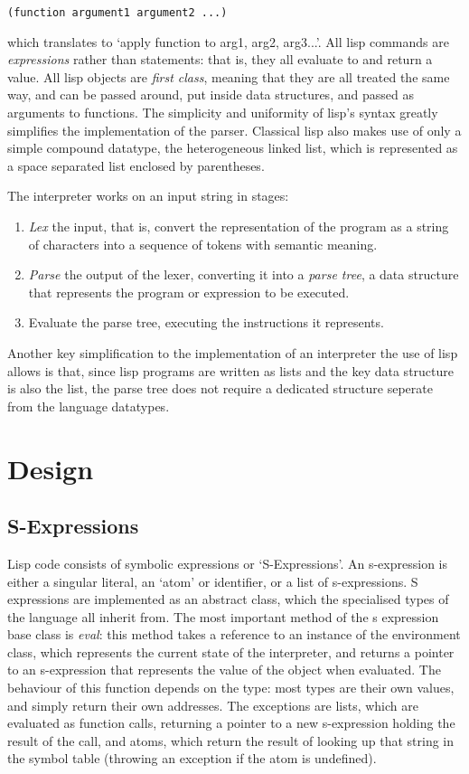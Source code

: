 \documentclass[12pt]{article}
\begin{document}
\begin{lstlisting}
(function argument1 argument2 ...)
\end{lstlisting}


which translates to `apply function to arg1, arg2, arg3...'. All lisp
commands are \textit{expressions} rather than statements: that is,
they all evaluate to and return a value. All lisp objects are
\textit{first class}, meaning that they are all treated the same way,
and can be passed around, put inside data structures, and passed as
arguments to functions. The simplicity and uniformity of lisp's syntax
greatly simplifies the implementation of the parser. Classical lisp
also makes use of only a simple compound datatype, the heterogeneous
linked list, which is represented as a space separated list enclosed
by parentheses.

The interpreter works on an input string in stages:
\begin{enumerate}
	\item \textit{Lex} the input, that is, convert the
	representation of the program as a string of characters into a
	sequence of tokens with semantic meaning. 
	\item \textit{Parse}
	the output of the lexer, converting it into a \textit{parse
	tree}, a data structure that represents the program or
	expression to be executed. 
	\item Evaluate the parse tree,
	executing the instructions it represents.
\end{enumerate}

Another key simplification to the implementation of an interpreter the
use of lisp allows is that, since lisp programs are written as lists
and the key data structure is also the list, the parse tree does not
require a dedicated structure seperate from the language datatypes.


\section{Design}
\subsection{S-Expressions}
\label{section:sexp}

Lisp code consists of symbolic expressions or `S-Expressions'. An
s-expression is either a singular literal, an `atom' or identifier, or
a list of s-expressions. S expressions are implemented as an abstract
class, which the specialised types of the language all inherit from.
The most important method of the s expression base class is
\textit{eval}: this method takes a reference to an instance of the
environment class, which represents the current state of the
interpreter, and returns a pointer to an s-expression that represents
the value of the object when evaluated. The behaviour of this function
depends on the type: most types are their own values, and simply
return their own addresses. The exceptions are lists,
which are evaluated as function calls, returning a pointer to a new
s-expression holding the result of the call, and atoms, which return
the result of looking up that string in the symbol table (throwing an
exception if the atom is undefined).
\end{document}
